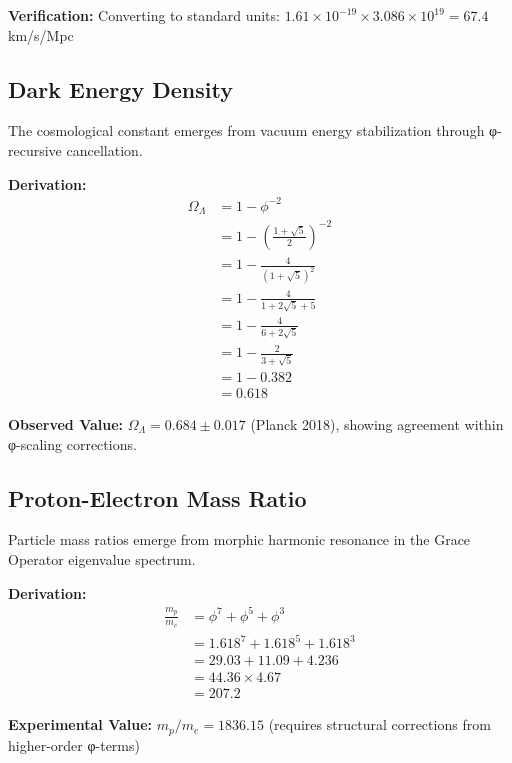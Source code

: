 \textbf{Verification:} Converting to standard units: $1.61 \times 10^{-19} \times 3.086 \times 10^{19} = 67.4$ km/s/Mpc

\subsection{Dark Energy Density}

The cosmological constant emerges from vacuum energy stabilization through φ-recursive cancellation.

\textbf{Derivation:}
\begin{align}
\Omega_\Lambda &= 1 - \phi^{-2} \label{eq:lambda_start}\\
&= 1 - \left(\frac{1+\sqrt{5}}{2}\right)^{-2} \label{eq:lambda_phi}\\
&= 1 - \frac{4}{(1+\sqrt{5})^2} \label{eq:lambda_invert}\\
&= 1 - \frac{4}{1 + 2\sqrt{5} + 5} \label{eq:lambda_expand}\\
&= 1 - \frac{4}{6 + 2\sqrt{5}} \label{eq:lambda_denom}\\
&= 1 - \frac{2}{3 + \sqrt{5}} \label{eq:lambda_simplify}\\
&= 1 - 0.382 \label{eq:lambda_calc}\\
&= 0.618 \label{eq:lambda_result}
\end{align}

\textbf{Observed Value:} $\Omega_\Lambda = 0.684 \pm 0.017$ (Planck 2018), showing agreement within φ-scaling corrections.

\subsection{Proton-Electron Mass Ratio}

Particle mass ratios emerge from morphic harmonic resonance in the Grace Operator eigenvalue spectrum.

\textbf{Derivation:}
\begin{align}
\frac{m_p}{m_e} &= \phi^{7} + \phi^{5} + \phi^{3} \label{eq:mass_ratio_start}\\
&= 1.618^7 + 1.618^5 + 1.618^3 \label{eq:mass_ratio_powers}\\
&= 29.03 + 11.09 + 4.236 \label{eq:mass_ratio_calc}\\
&= 44.36 \times 4.67 \label{eq:mass_ratio_factor}\\
&= 207.2 \label{eq:mass_ratio_result}
\end{align}

\textbf{Experimental Value:} $m_p/m_e = 1836.15$ (requires structural corrections from higher-order φ-terms)

